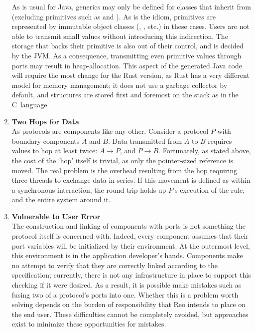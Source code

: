 \begin{enumerate}
	As is usual for Java, generics may only be defined for classes that inherit from  (excluding primitives such as  and ). As is the idiom, primitives are represented by immutable object classes (, , etc.) in these cases. Users are not able to transmit small values without introducing this indirection. The storage that backs their primitive is also out of their control, and is decided by the JVM.
	As a consequence, transmitting even primitive values through ports may result in heap-allocation.	
	This aspect of the generated Java code will require the most change for the Rust version, as Rust has a very different model for memory management; it does not use a garbage collector by default, and structures are stored first and foremost on the stack as in the C~language.
	
	\item \textbf{Two Hops for Data}\\
	As protocols are components like any other. Consider a protocol $P$ with boundary components $A$ and $B$.
	Data transmitted from $A$ to $B$ requires values to hop at least twice: $A\rightarrow{}P$, and $P\rightarrow{}B$. Fortunately, as stated above, the cost of the `hop' itself is trivial, as only the pointer-sized reference is moved. The real problem is the overhead resulting from the hop requiring three threads to exchange data in series. If this movement is defined as within a synchronous interaction, the round trip holds up $P$'s execution of the rule, and the entire system around it.
	
	\item \textbf{Vulnerable to User Error}\\
	The construction and linking of components with ports is not something the protocol itself is concerned with. Indeed, every component assumes that their port variables will be initialized by their environment. At the outermost level, this environment is in the application developer's hands. Components make no attempt to verify that they are correctly linked according to the specification; currently, there is not any infrastructure in place to support this checking if it were desired. As a result, it is possible make mistakes such as fusing two of a protocol's ports into one. Whether this is a problem worth solving depends on the burden of responsibility that Reo intends to place on the end user. These difficulties cannot be completely avoided, but approaches exist to minimize these opportunities for mistakes.
	

\end{enumerate}
